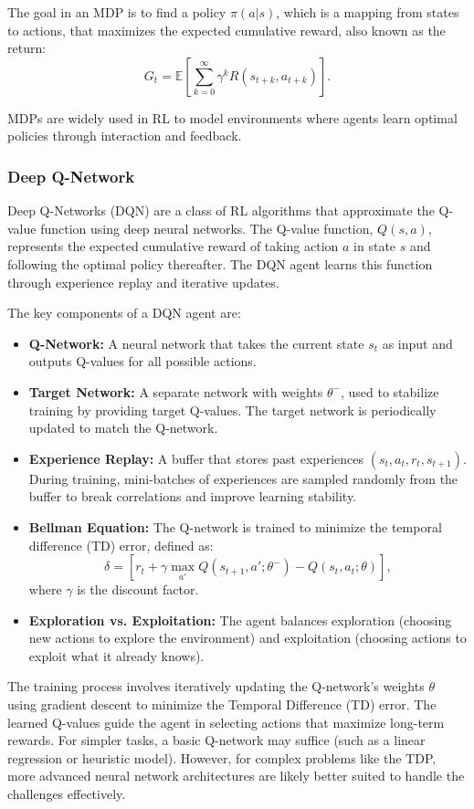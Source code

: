 \documentclass[runningheads]{llncs}
\begin{document}
The goal in an MDP is to find a policy $\pi(a|s)$, which is a mapping from states to actions, that maximizes the expected cumulative reward, also known as the return:
\[
G_t = \mathbb{E} \left[ \sum_{k=0}^\infty \gamma^k R(s_{t+k}, a_{t+k}) \right].
\]

MDPs are widely used in RL to model environments where agents learn optimal policies through interaction and feedback.

\subsubsection{Deep Q-Network}
Deep Q-Networks (DQN) are a class of RL algorithms that approximate the Q-value function using deep neural networks. 
The Q-value function, $Q(s, a)$, represents the expected cumulative reward of taking action $a$ in state $s$ and following the optimal policy thereafter. 
The DQN agent learns this function through experience replay and iterative updates.

The key components of a DQN agent are:

\begin{itemize}
    \item \textbf{Q-Network:} A neural network that takes the current state $s_t$ as input and outputs Q-values for all possible actions. 
    \item \textbf{Target Network:} A separate network with weights $\theta^-$, used to stabilize training by providing target Q-values. The target network is periodically updated to match the Q-network.
    \item \textbf{Experience Replay:} A buffer that stores past experiences $(s_t, a_t, r_t, s_{t+1})$. During training, mini-batches of experiences are sampled randomly from the buffer to break correlations and improve learning stability.
    \item \textbf{Bellman Equation:} The Q-network is trained to minimize the temporal difference (TD) error, defined as:
    \[
    \delta = \left[ r_t + \gamma \max_{a'} Q(s_{t+1}, a'; \theta^-) - Q(s_t, a_t; \theta) \right],
    \]
    where $\gamma$ is the discount factor.
    \item \textbf{Exploration vs. Exploitation:} The agent balances exploration (choosing new actions to explore the environment) and exploitation (choosing actions to exploit what it already knows).
\end{itemize}

The training process involves iteratively updating the Q-network's weights $\theta$ using gradient descent to minimize the Temporal Difference (TD) error. 
The learned Q-values guide the agent in selecting actions that maximize long-term rewards.
For simpler tasks, a basic Q-network may suffice (such as a linear regression or heuristic model). 
However, for complex problems like the TDP, more advanced neural network architectures are likely better suited to handle the challenges effectively.
\end{document}
